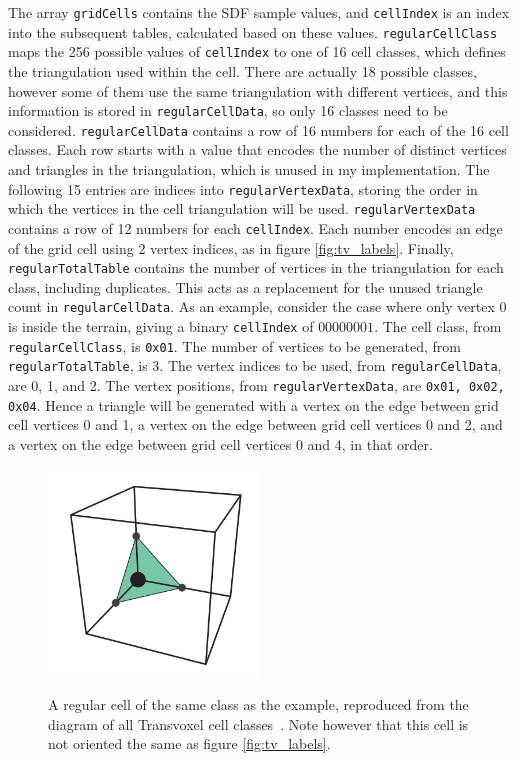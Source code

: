\documentclass[11pt]{article}
\begin{document}
The array \texttt{gridCells} contains the SDF sample values, and \texttt{cellIndex} is an index into the subsequent tables, calculated based on these values. 
\texttt{regularCellClass} maps the 256 possible values of \texttt{cellIndex} to one of 16 cell classes, which defines the triangulation used within the cell. There are actually 18 possible classes, however some of them use the same triangulation with different vertices, and this information is stored in \texttt{regularCellData}, so only 16 classes need to be considered. 
\texttt{regularCellData} contains a row of 16 numbers for each of the 16 cell classes. Each row starts with a value that encodes the number of distinct vertices and triangles in the triangulation, which is unused in my implementation. The following 15 entries are indices into \texttt{regularVertexData}, storing the order in which the vertices in the cell triangulation will be used. 
\texttt{regularVertexData} contains a row of 12 numbers for each \texttt{cellIndex}. Each number encodes an edge of the grid cell using 2 vertex indices, as in figure \ref{fig:tv_labels}. 
Finally, \texttt{regularTotalTable} contains the number of vertices in the triangulation for each class, including duplicates. This acts as a replacement for the unused triangle count in \texttt{regularCellData}.
As an example, consider the case where only vertex 0 is inside the terrain, giving a binary \texttt{cellIndex} of $00000001$. The cell class, from \texttt{regularCellClass}, is \texttt{0x01}. The number of vertices to be generated, from \texttt{regularTotalTable}, is 3. The vertex indices to be used, from \texttt{regularCellData}, are 0, 1, and 2. The vertex positions, from \texttt{regularVertexData}, are \texttt{0x01, 0x02, 0x04}. Hence a triangle will be generated with a vertex on the edge between grid cell vertices 0 and 1, a vertex on the edge between grid cell vertices 0 and 2, and a vertex on the edge between grid cell vertices 0 and 4, in that order.

\begin{figure}
  \caption{A regular cell of the same class as the example, reproduced from the diagram of all Transvoxel cell classes~\cite{lengyel}. Note however that this cell is not oriented the same as figure \ref{fig:tv_labels}.}
  \includegraphics[width=0.5\textwidth]{regular_cell_example_case.PNG}
  \label{fig:regular_cell_example_case}
\end{figure}
\end{document}
